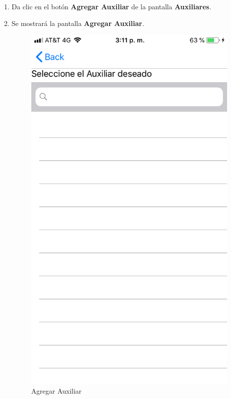 \begin{enumerate}
	\item Da clic en el botón \textbf{Agregar Auxiliar} de la pantalla \textbf{Auxiliares}.
	
	\item Se mostrará la pantalla \textbf{Agregar Auxiliar}.
	
	\begin{figure}[!htbp]			
		\hypertarget{fig:AgregarAuxiliar}{\hspace{1pt}}
		\begin{center}
			\includegraphics[height=0.4\textheight]{Paciente/AgregarAuxiliar/images/AgregarAuxiliar}
			\caption{Agregar Auxiliar}
			\label{fig:AgregarAuxiliar}
		\end{center}
	\end{figure}


\end{enumerate}
